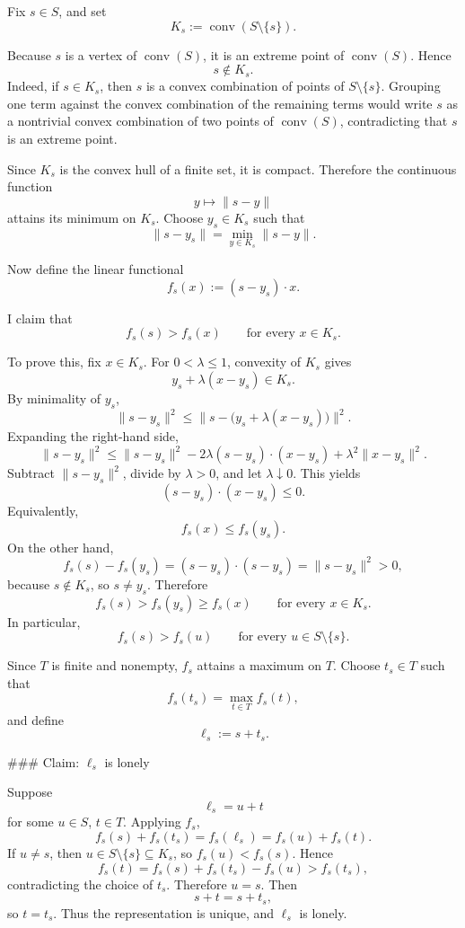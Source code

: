 Fix \(s\in S\), and set
\[
K_s:=\operatorname{conv}(S\setminus\{s\}).
\]

Because \(s\) is a vertex of \(\operatorname{conv}(S)\), it is an extreme point of \(\operatorname{conv}(S)\). Hence
\[
s\notin K_s.
\]
Indeed, if \(s\in K_s\), then \(s\) is a convex combination of points of \(S\setminus\{s\}\). Grouping one term against the convex combination of the remaining terms would write \(s\) as a nontrivial convex combination of two points of \(\operatorname{conv}(S)\), contradicting that \(s\) is an extreme point.

Since \(K_s\) is the convex hull of a finite set, it is compact. Therefore the continuous function
\[
y\mapsto \|s-y\|
\]
attains its minimum on \(K_s\). Choose \(y_s\in K_s\) such that
\[
\|s-y_s\|=\min_{y\in K_s}\|s-y\|.
\]

Now define the linear functional
\[
f_s(x):=(s-y_s)\cdot x.
\]

I claim that
\[
f_s(s)>f_s(x)\qquad\text{for every }x\in K_s.
\]

To prove this, fix \(x\in K_s\). For \(0<\lambda\le 1\), convexity of \(K_s\) gives
\[
y_s+\lambda(x-y_s)\in K_s.
\]
By minimality of \(y_s\),
\[
\|s-y_s\|^2
\le
\bigl\|s-\bigl(y_s+\lambda(x-y_s)\bigr)\bigr\|^2.
\]
Expanding the right-hand side,
\[
\|s-y_s\|^2
\le
\|s-y_s\|^2-2\lambda (s-y_s)\cdot(x-y_s)+\lambda^2\|x-y_s\|^2.
\]
Subtract \(\|s-y_s\|^2\), divide by \(\lambda>0\), and let \(\lambda\downarrow 0\). This yields
\[
(s-y_s)\cdot(x-y_s)\le 0.
\]
Equivalently,
\[
f_s(x)\le f_s(y_s).
\]
On the other hand,
\[
f_s(s)-f_s(y_s)
=
(s-y_s)\cdot(s-y_s)
=
\|s-y_s\|^2
>0,
\]
because \(s\notin K_s\), so \(s\neq y_s\). Therefore
\[
f_s(s)>f_s(y_s)\ge f_s(x)
\qquad\text{for every }x\in K_s.
\]
In particular,
\[
f_s(s)>f_s(u)\qquad\text{for every }u\in S\setminus\{s\}.
\]

Since \(T\) is finite and nonempty, \(f_s\) attains a maximum on \(T\). Choose \(t_s\in T\) such that
\[
f_s(t_s)=\max_{t\in T} f_s(t),
\]
and define
\[
\ell_s:=s+t_s.
\]

### Claim: \(\ell_s\) is lonely

Suppose
\[
\ell_s=u+t
\]
for some \(u\in S\), \(t\in T\). Applying \(f_s\),
\[
f_s(s)+f_s(t_s)=f_s(\ell_s)=f_s(u)+f_s(t).
\]
If \(u\neq s\), then \(u\in S\setminus\{s\}\subseteq K_s\), so \(f_s(u)<f_s(s)\). Hence
\[
f_s(t)=f_s(s)+f_s(t_s)-f_s(u)>f_s(t_s),
\]
contradicting the choice of \(t_s\). Therefore \(u=s\). Then
\[
s+t=s+t_s,
\]
so \(t=t_s\). Thus the representation is unique, and \(\ell_s\) is lonely.

